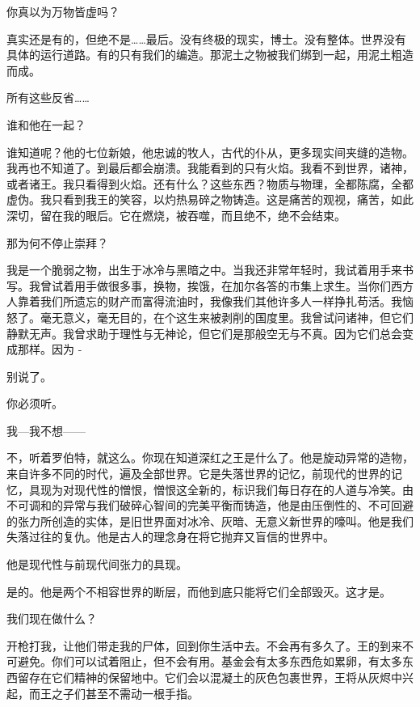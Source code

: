 \begin{scpbox}
你真以为万物皆虚吗？

真实还是有的，但绝不是……最后。没有终极的现实，博士。没有整体。世界没有具体的运行道路。有的只有我们的编造。那泥土之物被我们绑到一起，用泥土粗造而成。

所有这些反省……


谁和他在一起？

谁知道呢？他的七位新娘，他忠诚的牧人，古代的仆从，更多现实间夹缝的造物。我再也不知道了。到最后都会崩溃。我能看到的只有火焰。我看不到世界，诸神，或者诸王。我只看得到火焰。还有什么？这些东西？物质与物理，全都陈腐，全都虚伪。我只看到我王的笑容，以灼热易碎之物铸造。这是痛苦的观视，痛苦，如此深切，留在我的眼后。它在燃烧，被吞噬，而且绝不，绝不会结束。

那为何不停止崇拜？

我是一个脆弱之物，出生于冰冷与黑暗之中。当我还非常年轻时，我试着用手来书写。我曾试着用手做很多事，换物，挨饿，在加尔各答的市集上求生。当你们西方人靠着我们所遗忘的财产而富得流油时，我像我们其他许多人一样挣扎苟活。我恼怒了。毫无意义，毫无目的，在个这生来被剥削的国度里。我曾试问诸神，但它们静默无声。我曾求助于理性与无神论，但它们是那般空无与不真。因为它们总会变成那样。因为 -

别说了。

你必须听。

我—我不想——

不，听着罗伯特，就这么。你现在知道深红之王是什么了。他是旋动异常的造物，来自许多不同的时代，遍及全部世界。它是失落世界的记忆，前现代的世界的记忆，具现为对现代性的憎恨，憎恨这全新的，标识我们每日存在的人道与冷笑。由不可调和的异常与我们破碎心智间的完美平衡而铸造，他是由压倒性的、不可回避的张力所创造的实体，是旧世界面对冰冷、灰暗、无意义新世界的嚎叫。他是我们失落过往的复仇。他是古人的理念身在将它抛弃又盲信的世界中。

他是现代性与前现代间张力的具现。

是的。他是两个不相容世界的断层，而他到底只能将它们全部毁灭。这才是。


我们现在做什么？

开枪打我，让他们带走我的尸体，回到你生活中去。不会再有多久了。王的到来不可避免。你们可以试着阻止，但不会有用。基金会有太多东西危如累卵，有太多东西留存在它们精神的保留地中。它们会以混凝土的灰色包裹世界，王将从灰烬中兴起，而王之子们甚至不需动一根手指。


\end{scpbox}

